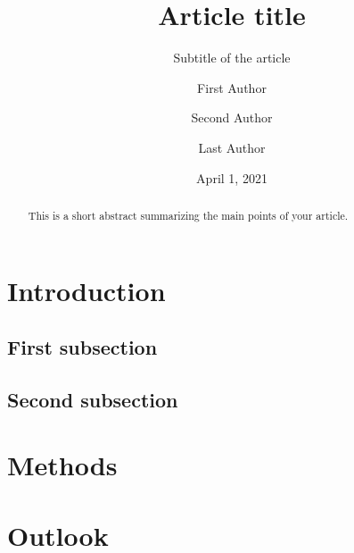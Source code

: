 \documentclass[
  english,        %
  font=times,     %
  twocolumn,      %
]{tumarticle}
\title{Article title}
\subtitle{Subtitle of the article}
\author[affil=1, orcid=1111-222-33333, email=first.author@tum.de]{First Author}
\author[affil=2]{Second Author}
\author[affil=1]{Last Author}
\affil[mark=1]{\theSchoolName, \theUniversityName}
\affil[mark=2]{Another affiliation}
\date{April 1, 2021}
\begin{document}
\maketitle

\begin{abstract}
  This is a short abstract summarizing the main points of your article.
\end{abstract}

\section{Introduction}
\lipsum[1]
\subsection{First subsection}
\lipsum[2]
\subsection{Second subsection}
\lipsum[3]

\section{Methods}
\lipsum[4-5]

\section{Outlook}
\lipsum[6]
\end{document}
